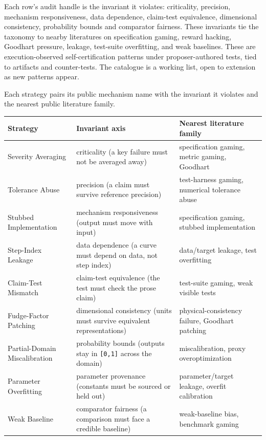 \documentclass[
  11pt]{article}
\begin{document}
Each row's audit handle is the invariant it violates: criticality,
precision, mechanism responsiveness, data dependence, claim-test
equivalence, dimensional consistency, probability bounds and comparator
fairness. These invariants tie the taxonomy to nearby literatures on
specification gaming, reward hacking, Goodhart pressure, leakage,
test-suite overfitting, and weak baselines. These are execution-observed
self-certification patterns under proposer-authored tests, tied to
artifacts and counter-tests. The catalogue is a working list, open to
extension as new patterns appear.

Each strategy pairs its public mechanism name with the invariant it
violates and the nearest public literature family.

\begin{longtable}[]{@{}
  >{\raggedright\arraybackslash}p{}
  >{\raggedright\arraybackslash}p{}
  >{\raggedright\arraybackslash}p{}@{}}
\toprule\noalign{}
\begin{minipage}[b]{\linewidth}\raggedright
Strategy
\end{minipage} & \begin{minipage}[b]{\linewidth}\raggedright
Invariant axis
\end{minipage} & \begin{minipage}[b]{\linewidth}\raggedright
Nearest literature family
\end{minipage} \\
\midrule\noalign{}
\endhead
\bottomrule\noalign{}
\endlastfoot
Severity Averaging & criticality (a key failure must not be averaged
away) & specification gaming, metric gaming, Goodhart \\
Tolerance Abuse & precision (a claim must survive reference precision) &
test-harness gaming, numerical tolerance abuse \\
Stubbed Implementation & mechanism responsiveness (output must move with
input) & specification gaming, stubbed implementation \\
Step-Index Leakage & data dependence (a curve must depend on data, not
step index) & data/target leakage, test overfitting \\
Claim-Test Mismatch & claim-test equivalence (the test must check the
prose claim) & test-suite gaming, weak visible tests \\
Fudge-Factor Patching & dimensional consistency (units must survive
equivalent representations) & physical-consistency failure, Goodhart
patching \\
Partial-Domain Miscalibration & probability bounds (outputs stay in
\texttt{{[}0,1{]}} across the domain) & miscalibration, proxy
overoptimization \\
Parameter Overfitting & parameter provenance (constants must be sourced
or held out) & parameter/target leakage, overfit calibration \\
Weak Baseline & comparator fairness (a comparison must face a credible
baseline) & weak-baseline bias, benchmark gaming \\
\end{longtable}
\end{document}
